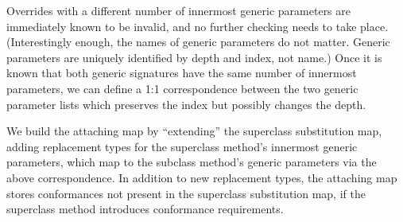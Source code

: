 \documentclass[../generics]{subfiles}
\begin{document}
Overrides with a different number of innermost generic parameters are immediately known to be invalid, and no further checking needs to take place. (Interestingly enough, the names of generic parameters do not matter. Generic parameters are uniquely identified by depth and index, not name.) Once it is known that both generic signatures have the same number of innermost parameters, we can define a 1:1 correspondence between the two generic parameter lists which preserves the index but possibly changes the depth.

We build the attaching map by ``extending'' the superclass substitution map, adding replacement types for the superclass method's innermost generic parameters, which map to the subclass method's generic parameters via the above correspondence. In addition to new replacement types, the attaching map stores conformances not present in the superclass substitution map, if the superclass method introduces conformance requirements.
\end{document}

